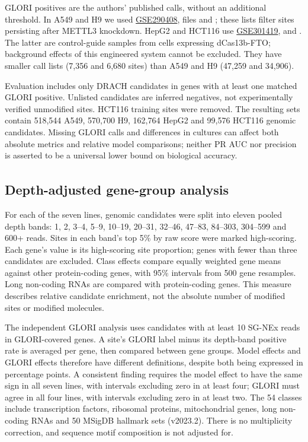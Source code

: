 \documentclass[11pt,a4paper]{article}
\makeatletter
\newcounter{appmarknum}
\DeclareRobustCommand{\appmark}[1]{%
    \refstepcounter{appmarknum}\label{appmark@#1}%
    \textsuperscript{\arabic{appmarknum}}}
\makeatother
\begin{document}
GLORI positives are the authors' published calls, without an additional
threshold. In A549 and H9 we used
\href{https://www.ncbi.nlm.nih.gov/geo/query/acc.cgi?acc=GSE290408}{GSE290408},
files  and
; these lists filter sites persisting
after METTL3 knockdown. HepG2 and HCT116 use
\href{https://www.ncbi.nlm.nih.gov/geo/query/acc.cgi?acc=GSE301419}{GSE301419},
 and
. The latter are control-guide
samples from cells expressing dCas13b-FTO; background effects of this
engineered system cannot be excluded. They have smaller call lists
(7,356 and 6,680 sites) than A549 and H9 (47,259 and 34,906).

Evaluation includes only DRACH candidates in genes with at least one matched
GLORI positive. Unlisted candidates are inferred negatives, not experimentally
verified unmodified sites. HCT116 training sites were removed. The resulting
sets contain 518,544 A549, 570,700 H9, 162,764 HepG2 and 99,576 HCT116 genomic
candidates. Missing GLORI calls and differences in cultures can affect both
absolute metrics and relative model comparisons; neither PR AUC nor precision
is asserted to be a universal lower bound on biological accuracy.

\subsection*{Depth-adjusted gene-group analysis\texorpdfstring{\appmark{app:sgnex-gene-methods}}{}}
\label{app:sgnex-gene-methods}
For each of the seven lines, genomic candidates were split into eleven pooled
depth bands: 1, 2, 3--4, 5--9, 10--19, 20--31, 32--46, 47--83, 84--303,
304--599 and 600+ reads. Sites in each band's top 5\% by raw score were
marked high-scoring. Each gene's value is its high-scoring site proportion;
genes with fewer than three candidates are excluded. Class effects compare
equally weighted gene means against other protein-coding genes, with 95\%
intervals from 500 gene resamples. Long non-coding RNAs are compared with
protein-coding genes. This measure describes relative candidate enrichment,
not the absolute number of modified sites or modified molecules.

The independent GLORI analysis uses candidates with at least 10 SG-NEx reads
in GLORI-covered genes. A site's GLORI label minus its depth-band positive
rate is averaged per gene, then compared between gene groups. Model effects
and GLORI effects therefore have different definitions, despite both being
expressed in percentage points. A consistent finding requires the model
effect to have the same sign in all seven lines, with intervals excluding
zero in at least four; GLORI must agree in all four lines, with intervals
excluding zero in at least two. The 54 classes include transcription factors,
ribosomal proteins, mitochondrial genes, long non-coding RNAs and 50 MSigDB
hallmark sets (v2023.2). There is no multiplicity correction, and sequence
motif composition is not adjusted for.
\end{document}
